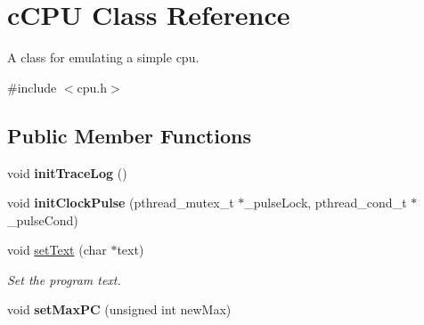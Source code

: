 \hypertarget{classcCPU}{\section{c\-C\-P\-U \-Class \-Reference}
\label{d2/dc6/classcCPU}
}


\-A class for emulating a simple cpu.  




{\ttfamily \#include $<$cpu.\-h$>$}

\subsection*{\-Public \-Member \-Functions}
\begin{DoxyCompactItemize}
\item 
\hypertarget{classcCPU_a8ed9b15ed0e8ae225eb821ac0974ced0}{void {\bfseries init\-Trace\-Log} ()}\label{d2/dc6/classcCPU_a8ed9b15ed0e8ae225eb821ac0974ced0}

\item 
\hypertarget{classcCPU_a09419d6cb8371336e123c9b5eb56487d}{void {\bfseries init\-Clock\-Pulse} (pthread\-\_\-mutex\-\_\-t $\ast$\-\_\-pulse\-Lock, pthread\-\_\-cond\-\_\-t $\ast$\-\_\-pulse\-Cond)}\label{d2/dc6/classcCPU_a09419d6cb8371336e123c9b5eb56487d}

\item 
void \hyperlink{classcCPU_acd957640be8abb7c0d8a24010ed0e737}{set\-Text} (char $\ast$text)
\begin{DoxyCompactList}\small\item\em \-Set the program text. \end{DoxyCompactList}\item 
\hypertarget{classcCPU_ab4b62a77df9c4b32a598326e4ec0ca41}{void {\bfseries set\-Max\-P\-C} (unsigned int new\-Max)}\label{d2/dc6/classcCPU_ab4b62a77df9c4b32a598326e4ec0ca41}


\end{DoxyCompactItemize}
